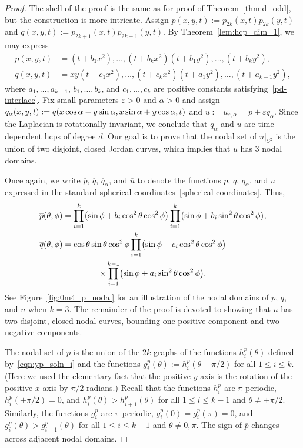 \documentclass[AHL,Unicode,longabstracts,published]{cedram}
\newcommand{\sphere}{\mathbb{S}}
\newcommand{\ol}{\overline}
\renewcommand{\epsilon}{\varepsilon}
\let\originalleft\left
\let\originalright\right
\renewcommand{\left}{\mathopen{}\mathclose\bgroup\originalleft}
\renewcommand{\right}{\aftergroup\egroup\originalright}
\begin{document}
\begin{proof}
The shell of the proof is the same as for proof of Theorem~\ref{thm:d_odd}, but the construction is more intricate. Assign $p(x,y,t) := p_{2k}(x,t)p_{2k}(y,t)$ and $q(x,y,t):=p_{2k+1}(x,t)p_{2k-1}(y,t)$. By Theorem~\ref{lem:hcp_dim_1}, we may express
\begin{align*}
p(x,y,t) &= (t + b_1 x^2) ,\dots, (t + b_k x^2) (t+ b_1 y^2) ,\dots,  (t + b_ky^2),\\
q(x,y,t) &= xy(t + c_1 x^2),\dots, (t + c_{k} x^2)(t+a_1 y^2),\dots,  (t + a_{k-1} y^2),
\end{align*}
where $a_1,\dots,a_{k-1}$, $b_1,\dots,b_k$, and $c_1,\dots, c_k$ are positive constants satisfying~\eqref{pd-interlace}. Fix small parameters $\epsilon>0$ and $\alpha>0$ and assign $q_\alpha(x,y,t) := q(x \cos \alpha - y \sin \alpha,\linebreak x \sin \alpha + y \cos \alpha, t)$ and $u:=u_{\epsilon,\alpha}=p+\epsilon q_\alpha$. Since the Laplacian is rotationally invariant, we conclude that $q_\alpha$ and $u$ are time-dependent hcps of degree $d$. Our goal is to prove that the nodal set of $u|_{\sphere^2}$ is the union of two disjoint, closed Jordan curves, which implies that $u$ has 3 nodal domains.



Once again, we write $\ol{p}$, $\ol{q}$, $\ol{q}_\alpha$, and $\ol{u}$ to denote the functions $p$, $q$, $q_\alpha$, and $u$ expressed in the standard spherical coordinates~\eqref{spherical-coordinates}. Thus,
\begin{multline}
\begin{aligned}[t]
\ol{p}(\theta, \phi) & = \prod_{i=1}^k \left(\sin\phi + b_i \cos^2\theta \cos^2\phi\right)\prod_{i=1}^k\left(\sin\phi+b_i\sin^2 \theta \cos^2 \phi\right), \\
\ol{q}(\theta, \phi) & = \cos \theta \sin \theta \cos^2\phi \prod_{i=1}^{k} \left(\sin\phi+c_i\cos^2\theta\cos^2 \phi\right)
\end{aligned}
\\
\times\prod_{i=1}^{k-1} \left(\sin\phi+a_i\sin^2\theta\cos^2 \phi\right).
\end{multline}
See Figure~\ref{fig:0m4_p_nodal} for an illustration of the nodal domains of $\ol{p}$, $\ol{q}$, and $\ol{u}$ when $k=3$. The remainder of the proof is devoted to showing that $\ol{u}$ has two disjoint, closed nodal curves, bounding one positive component and two negative components.

The nodal set of $\ol{p}$ is the union of the $2k$ graphs of the functions $h^p_i(\theta)$ defined by~\eqref{eqn:yp_soln_i} and the functions $g^p_i(\theta):=h^p_i(\theta-\pi/2)$ for all $1\leq i\leq k$. (Here we used the elementary fact that the positive $y$-axis is the rotation of the positive $x$-axis by $\pi/2$ radians.) Recall that the functions $h^p_i$ are $\pi$-periodic, $h^p_i(\pm\pi/2)=0$, and $h^p_i(\theta)>h^p_{i+1}(\theta)$ for all $1\leq i\leq k-1$ and $\theta\neq\pm \pi/2$. Similarly, the functions $g^p_i$ are $\pi$-periodic, $g^p_i(0)=g^p_i(\pi)=0$, and $g^p_i(\theta)>g^p_{i+1}(\theta)$ for all $1\leq i\leq k -1$ and $\theta\neq 0,\pi$. The sign of $\ol{p}$ changes across adjacent nodal domains.


\end{proof}
\end{document}
